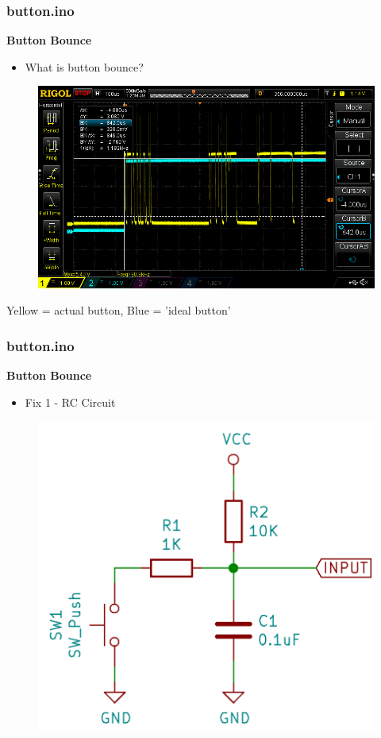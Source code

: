 \documentclass[t]{beamer}
\begin{document}
\begin{frame}[t]
\frametitle{button.ino}
\textbf{Button Bounce}
\begin{itemize}
	\item What is button bounce?
\end{itemize}
\begin{figure}
	\includegraphics[scale=0.3]{bouncingBegin.png}
\end{figure}
\centering
Yellow = actual button, Blue = 'ideal button'

\end{frame}


\begin{frame}[t]
\frametitle{button.ino}
\textbf{Button Bounce}
\begin{itemize}
	\item Fix 1 - RC Circuit
\end{itemize}
\begin{figure}
	\includegraphics[scale=0.3]{RCswitch.PNG}
\end{figure}
\end{frame}
\end{document}
